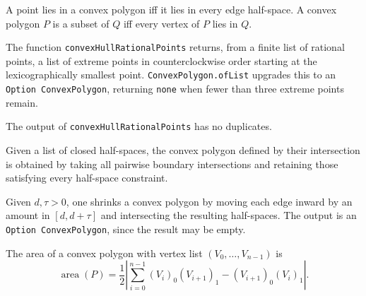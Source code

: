 \begin{definition}
  \label{def:contains}
  \leanok
  A point lies in a convex polygon iff it lies in every edge half-space.
  A convex polygon $P$ is a subset of $Q$ iff every vertex of $P$ lies in
  $Q$.
\end{definition}

\begin{definition}
  \label{def:convexHullRationalPoints}
  The function \texttt{convexHullRationalPoints} returns, from a finite
  list of rational points, a list of extreme points in counterclockwise
  order starting at the lexicographically smallest point.
  \texttt{ConvexPolygon.ofList} upgrades this to an \texttt{Option
  ConvexPolygon}, returning \texttt{none} when fewer than three extreme
  points remain.
\end{definition}

\begin{lemma}
  \label{lem:convexHullRationalPoints-nodup}
  The output of \texttt{convexHullRationalPoints} has no duplicates.
\end{lemma}

\begin{definition}
  \label{def:ofHalfSpaces}
  \leanok
  Given a list of closed half-spaces, the convex polygon defined by their
  intersection is obtained by taking all pairwise boundary intersections
  and retaining those satisfying every half-space constraint.
\end{definition}

\begin{definition}
  \label{def:shrink}
  \leanok
  Given $d, \tau > 0$, one shrinks a convex polygon by moving each edge
  inward by an amount in $[d, d + \tau]$ and intersecting the resulting
  half-spaces. The output is an \texttt{Option ConvexPolygon}, since the
  result may be empty.
\end{definition}

\begin{definition}
  \label{def:shoelace}
  \leanok
  The area of a convex polygon with vertex list $(V_0, \ldots, V_{n-1})$
  is
  \[
    \operatorname{area}(P) = \frac{1}{2}
    \left| \sum_{i=0}^{n-1} (V_i)_0 (V_{i+1})_1 - (V_{i+1})_0 (V_i)_1 \right|.
  \]
\end{definition}

